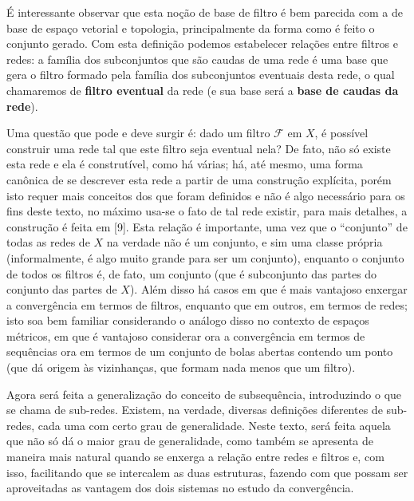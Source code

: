 \documentclass[12pt, a4paper]{article}
\theoremstyle{definition}
\begin{document}
É interessante observar que esta noção de base de filtro é bem parecida com a de base de espaço vetorial e topologia, principalmente da forma como é feito o conjunto gerado. Com esta definição podemos estabelecer relações entre filtros e redes: a família dos subconjuntos que são caudas de uma rede é uma base que gera o filtro formado pela família dos subconjuntos eventuais desta rede, o qual chamaremos de \textbf{filtro eventual} da rede (e sua base será a \textbf{base de caudas da rede}). 

Uma questão que pode e deve surgir é: dado um filtro $\mathcal{F}$ em $X$, é possível construir uma rede tal que este filtro seja eventual nela? De fato, não só existe esta rede e ela é construtível, como há várias; há, até mesmo, uma forma canônica de se descrever esta rede a partir de uma construção explícita, porém isto requer mais conceitos dos que foram definidos e não é algo necessário para os fins deste texto, no máximo usa-se o fato de tal rede existir, para mais detalhes, a construção é feita em [9]. Esta relação é importante, uma vez que o ``conjunto'' de todas as redes de $X$ na verdade não é um conjunto, e sim uma classe própria (informalmente, é algo muito grande para ser um conjunto), enquanto o conjunto de todos os filtros é, de fato, um conjunto (que é subconjunto das partes do conjunto das partes de $X$). Além disso há casos em que é mais vantajoso enxergar a convergência em termos de filtros, enquanto que em outros, em termos de redes; isto soa bem familiar considerando o análogo disso no contexto de espaços métricos, em que é vantajoso considerar ora a convergência em termos de sequências ora em termos de um conjunto de bolas abertas contendo um ponto (que dá origem às vizinhanças, que formam nada menos que um filtro).

Agora será feita a generalização do conceito de subsequência, introduzindo o que se chama de sub-redes. Existem, na verdade, diversas definições diferentes de sub-redes, cada uma com certo grau de generalidade. Neste texto, será feita aquela que não só dá o maior grau de generalidade, como também se apresenta de maneira mais natural quando se enxerga a relação entre redes e filtros e, com isso, facilitando que se intercalem as duas estruturas, fazendo com que possam ser aproveitadas as vantagem dos dois sistemas no estudo da convergência. 
\end{document}
